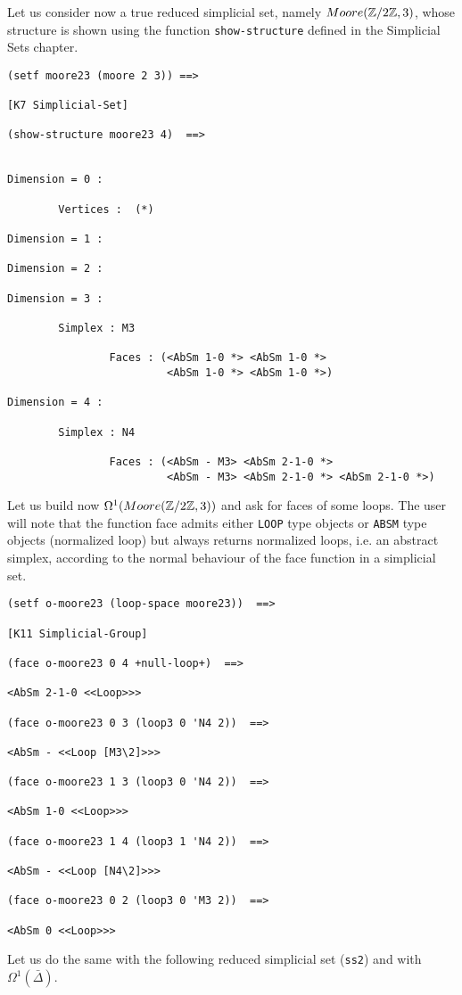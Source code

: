 Let us consider now a true reduced simplicial set, namely $Moore({{\Bbb Z}}/{2{{\Bbb Z}}}, 3)$, 
whose structure is shown using the function {\tt show-structure} defined in the Simplicial Sets chapter.
{\footnotesize\begin{verbatim}
(setf moore23 (moore 2 3)) ==>

[K7 Simplicial-Set]

(show-structure moore23 4)  ==>


Dimension = 0 :

        Vertices :  (*)

Dimension = 1 :

Dimension = 2 :

Dimension = 3 :

        Simplex : M3

                Faces : (<AbSm 1-0 *> <AbSm 1-0 *> 
                         <AbSm 1-0 *> <AbSm 1-0 *>)

Dimension = 4 :

        Simplex : N4

                Faces : (<AbSm - M3> <AbSm 2-1-0 *>
                         <AbSm - M3> <AbSm 2-1-0 *> <AbSm 2-1-0 *>)
\end{verbatim}}
Let us build now $\Omega^1(Moore({{\Bbb Z}}/{2{{\Bbb Z}}}, 3))$ and ask for faces of some loops.
The user will note that the function face admits either {\tt LOOP} type objects or
{\tt ABSM} type objects (normalized loop) but always returns normalized loops, i.e.
an abstract simplex, according to the normal behaviour of the face function in a
simplicial set.
{\footnotesize\begin{verbatim}
(setf o-moore23 (loop-space moore23))  ==>

[K11 Simplicial-Group]

(face o-moore23 0 4 +null-loop+)  ==>

<AbSm 2-1-0 <<Loop>>>

(face o-moore23 0 3 (loop3 0 'N4 2))  ==>

<AbSm - <<Loop [M3\2]>>>

(face o-moore23 1 3 (loop3 0 'N4 2))  ==>

<AbSm 1-0 <<Loop>>>

(face o-moore23 1 4 (loop3 1 'N4 2))  ==>

<AbSm - <<Loop [N4\2]>>>

(face o-moore23 0 2 (loop3 0 'M3 2))  ==>

<AbSm 0 <<Loop>>>
\end{verbatim}}
\newpage
Let us do the same with the following reduced simplicial set ({\tt ss2}) and with $\Omega^1(\bar{\Delta})$.

